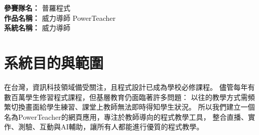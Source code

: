 \documentclass[12pt]{article}
\begin{document}
\date{}
\usetikzlibrary{automata, positioning, arrows}
{}

\noindent
\textbf{參賽隊名：} 普羅程式 \\
\textbf{作品名稱：} 威力導師 PowerTeacher \\
\textbf{系統名稱：} 威力導師

\section{系統目的與範圍}

在台灣，資訊科技領域備受關注，且程式設計已成為學校必修課程。
儘管每年有數百萬學生修習程式課程，但基層教育仍面臨著許多問題：
以往的教學方式需頻繁切換畫面給學生練習、課堂上教師無法即時得知學生狀況。
所以我們建立一個名為PowerTeacher的網頁應用，專注於教師導向的程式教學工具，
整合直播、實作、測驗、互動與AI輔助，讓所有人都能進行優質的程式教學。
\end{document}
